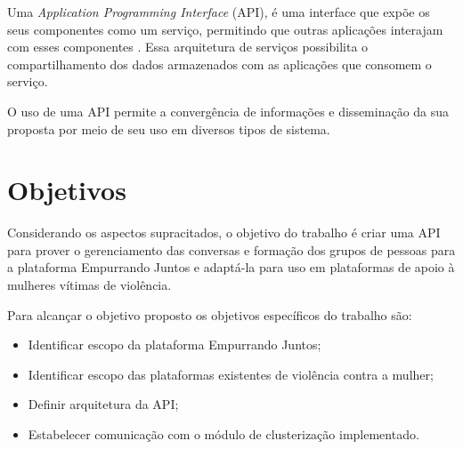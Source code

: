 
Uma \textit{Application Programming Interface} (API), é uma interface que expõe os seus componentes como um serviço, 
permitindo que outras aplicações interajam com esses componentes \cite{wagh2012comparative, understanding_web}. 
Essa arquitetura de serviços possibilita o compartilhamento dos dados armazenados com as aplicações que consomem o serviço. 

O uso de uma API permite a convergência de informações e disseminação da sua proposta por meio de seu uso em diversos tipos de sistema.



\section{Objetivos}


Considerando os aspectos supracitados, o objetivo do trabalho é criar uma API para prover o gerenciamento das conversas e formação
dos grupos de pessoas para a plataforma Empurrando Juntos e adaptá-la para uso em plataformas de apoio à mulheres vítimas de violência.

Para alcançar o objetivo proposto os objetivos específicos do trabalho são:
\begin{itemize}
	\item Identificar escopo da plataforma Empurrando Juntos;
	\item Identificar escopo das plataformas existentes de violência contra a mulher;
	\item Definir arquitetura da API;
	\item Estabelecer comunicação com o módulo de clusterização implementado.
\end{itemize}

